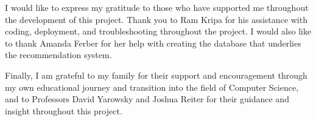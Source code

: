 

I would like to express my gratitude to those who have supported me throughout the development of this project. Thank you to Ram Kripa for his assistance with coding, deployment, and troubleshooting throughout the project. I would also like to thank Amanda Ferber for her help with creating the database that underlies the recommendation system. 

Finally, I am grateful to my family for their support and encouragement through my own educational journey and transition into the field of Computer Science, and to Professors David Yarowsky and Joshua Reiter for their guidance and insight throughout this project.  